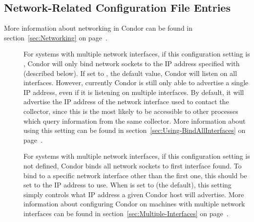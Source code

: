 \subsection{\label{sec:Network-Related-Config-File-Entries}Network-Related Configuration File Entries}

More information about networking in Condor can be found in
section~\ref{sec:Networking} on page~\pageref{sec:Networking}.

\begin{description}

\item[] \label{param:BindAllInterfaces}
  For systems with multiple network interfaces, if this configuration
  setting is , Condor will only bind network sockets to 
  the IP address specified with
   (described below).  If set to ,
  the default value, Condor will listen on all interfaces.
  However, currently Condor is still only able to advertise a single
  IP address, even if it is listening on multiple interfaces.  By
  default, it will advertise the IP address of the network interface
  used to contact the collector, since this is the most likely to be
  accessible to other processes which query information from the same
  collector.
  More information about using this setting can be found in
  section~\ref{sec:Using-BindAllInterfaces} on
  page~\pageref{sec:Using-BindAllInterfaces}. 

\item[] \label{param:NetworkInterface}
  For systems with multiple network interfaces, if this configuration
  setting is not defined, Condor binds all network sockets to first
  interface found.
  To bind to a specific network interface other than the
  first one, this  should be set to 
  the IP address to use.
  When  is set to  (the
  default), this
  setting simply controls what IP address a given Condor host will
  advertise.
  More information about configuring Condor on machines with multiple
  network interfaces can be found in
  section~\ref{sec:Multiple-Interfaces} on
  page~\pageref{sec:Multiple-Interfaces}.


\end{description}
